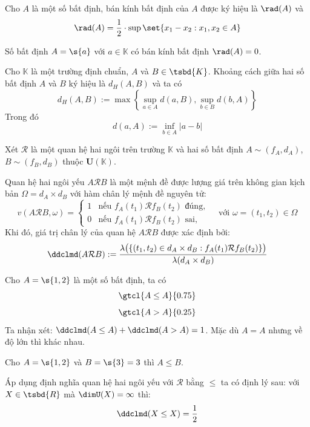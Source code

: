 \begin{definition}
	Cho $A$ là một số bất định, bán kính bất định của $A$ được ký hiệu là $\rad(A)$ và $$\rad(A) = \frac{1}{2} \cdot \sup \set{x_1 - x_2 : x_1, x_2 \in A}$$
\end{definition}
\begin{corollary}
	Số bất định $A = \s{a}$ với $a \in \mathbb{K}$ có bán kính bất định $\rad(A) = 0$.
\end{corollary}
\begin{definition}
	Cho $\mathbb{K}$ là một trường định chuẩn, $A$ và $B \in \tsbd{K}$. Khoảng cách giữa hai số bất định $A$ và $B$ ký hiệu là $d_H(A,B)$ và ta có
	$$
	d_H(A,B) := \max\left\{\sup_{a \in A}{d(a,B),\sup_{b \in B}{d(b,A)}}\right\}
	$$ Trong đó
	$$d(a,A) := \inf_{b\in A}{|a-b|}$$
\end{definition}
\begin{definition}
	Xét $\mathcal{R}$ là một quan hệ hai ngôi trên trường $\mathbb{K}$ và hai số bất định $A \sim (f_A, d_A)$, $B \sim (f_B, d_B)$ thuộc $\mathbf{U}(\mathbb{K})$. 
	
	Quan hệ hai ngôi yếu $A \mathcal{R} B$ là một mệnh đề được lượng giá trên không gian kịch bản $\Omega = d_A \times d_B$ với hàm chân lý mệnh đề nguyên tử:
	\[
	v(A \mathcal{R} B, \omega) = \begin{cases} 
		1 & \text{nếu } f_A(t_1) \mathcal{R} f_B(t_2) \text{ đúng}, \\
		0 & \text{nếu } f_A(t_1) \mathcal{R} f_B(t_2) \text{ sai},
	\end{cases} \quad \text{với } \omega = (t_1, t_2) \in \Omega
	\]
	Khi đó, giá trị chân lý của quan hệ $A \mathcal{R} B$ được xác định bởi:
	\[
	\ddclmd(A \mathcal{R} B) := \frac{\lambda\big(\{(t_1, t_2) \in d_A \times d_B : f_A(t_1) \mathcal{R} f_B(t_2)\}\big)}{\lambda(d_A \times d_B)}
	\]
\end{definition}
\begin{example}
	Cho $A = \s{1,2}$ là một số bất định, ta có $$\gtcl{A\leq A}{0.75}$$ $$\gtcl{A>A}{0.25}$$
	Ta nhận xét: $\ddclmd(A\leq A) + \ddclmd(A>A) = 1$. Mặc dù $A=A$ nhưng về độ lớn thì khác nhau.
\end{example}
\begin{example}
	Cho $A = \s{1,2}$ và $B = \s{3} = 3$ thì $A \leq B$.
\end{example}
\begin{theorem}
	Áp dụng định nghĩa quan hệ hai ngôi yếu với $\mathcal{R}$ bằng $\leq$ ta có định lý sau:
	với $X \in \tsbd{R}$ mà $\dimU(X) = \infty$ thì: 
	$$\ddclmd(X\leq X) = \frac{1}{2}$$
\end{theorem}
